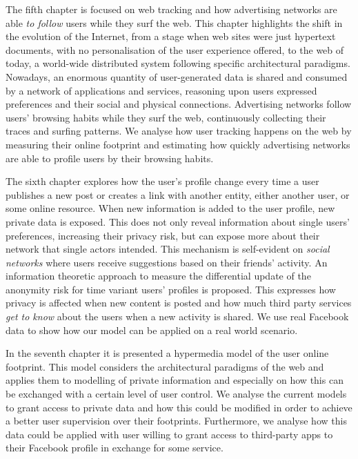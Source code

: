 The fifth chapter is focused on web tracking and how advertising networks are able \emph{to follow} users while they surf the web. This chapter highlights the shift in the evolution of the Internet, from a stage when web sites were just hypertext documents, with no personalisation of the user experience offered, to the web of today, a world-wide distributed system following specific architectural paradigms. Nowadays, an enormous quantity of user-generated data is shared and consumed by a network of applications and services, reasoning upon users expressed preferences and their social and physical connections. Advertising networks follow users’ browsing habits while they surf the web, continuously collecting their traces and surfing patterns. We analyse how user tracking happens on the web by measuring their online footprint and estimating how quickly advertising networks are able to profile users by their browsing habits.

The sixth chapter explores how the user's profile change every time a user publishes a new post or creates a link with another entity, either another user, or some online resource. When new information is added to the user profile, new private data is exposed. This does not only reveal information about single users' preferences, increasing their privacy risk, but can expose more about their network that single actors intended. This mechanism is self-evident on \emph{social networks} where users receive suggestions based on their friends’ activity. An information theoretic approach to measure the differential update of the anonymity risk for time variant users’ profiles is proposed. This expresses how privacy is affected when new content is posted and how much third party services \emph{get to know} about the users when a new activity is shared. We use real Facebook data to show how our model can be applied on a real world scenario.

In the seventh chapter it is presented a hypermedia model of the user online footprint. This model considers the architectural paradigms of the web and applies them to modelling of private information and especially on how this can be exchanged with a certain level of user control. We analyse the current models to grant access to private data and how this could be modified in order to achieve a better user supervision over their footprints. Furthermore, we analyse how this data could be applied with user willing to grant access to third-party apps to their Facebook profile in exchange for some service.